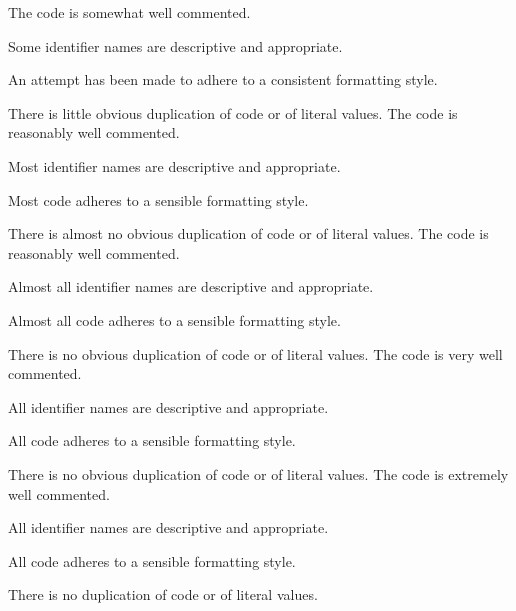 \begin{markingrubric}
        \grade The code is somewhat well commented.
            \par Some identifier names are descriptive and appropriate.
            \par An attempt has been made to adhere to a consistent formatting style.
             \par There is little obvious duplication of code or of literal values.           
        \grade The code is reasonably well commented.
            \par Most identifier names are descriptive and appropriate.
            \par Most code adheres to a sensible formatting style.
             \par There is almost no obvious duplication of code or of literal values.   
        \grade The code is reasonably well commented.
            \par Almost all identifier names are descriptive and appropriate.
            \par Almost all code adheres to a sensible formatting style.
             \par There is no obvious duplication of code or of literal values.
        \grade The code is very well commented.
            \par All identifier names are descriptive and appropriate.
            \par All code adheres to a sensible formatting style.
             \par There is no obvious duplication of code or of literal values.
        \grade The code is extremely well commented.
            \par All identifier names are descriptive and appropriate.
            \par All code adheres to a sensible formatting style.
            \par There is no duplication of code or of literal values.
\end{markingrubric}

